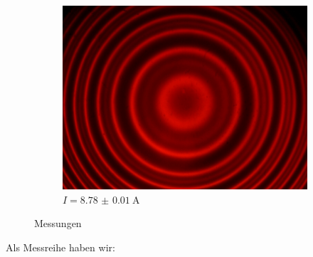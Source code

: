 \begin{figure}[!ht]
\begin{subfigure}{0.48\textwidth}
			\centering
			\includegraphics[width=\textwidth]{images/Capture_821.bmp.jpg}
			\caption{$I = \SI{8.78(1)}{\ampere}$}
			\label{fig:red_I8.78}
		\end{subfigure}
	    \caption{Messungen}
	    \label{fig:tv4-messungen}
	\end{figure}
	\newpage
	Als Messreihe haben wir:
	\newpage
	

